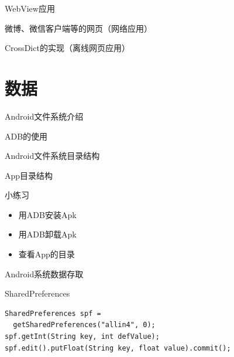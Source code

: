 \documentclass[presentation,dvipdfmx,CJKbookmarks]{beamer}
\begin{document}
\begin{CJK*}{UTF8}{simsun}
\begin{frame}[label={sec:org11b3bf5}]{WebView\thinspace 应用}
\begin{block}{微博、微信客户端等的网页（网络应用）}
\end{block}
\begin{block}{CrossDict\thinspace 的实现（离线网页应用）}
\end{block}
\end{frame}

\section{数据}
\label{sec:org08dc7b0}
\begin{frame}[label={sec:orgf2e294d}]{Android\thinspace 文件系统介绍}
\begin{block}{ADB\thinspace 的使用}
\end{block}
\begin{block}{Android\thinspace 文件系统目录结构}
\end{block}
\begin{block}{App\thinspace 目录结构}
\end{block}
\end{frame}

\begin{frame}[label={sec:org217fc53}]{小练习}
\begin{itemize}
\item 用\thinspace ADB\thinspace 安装\thinspace Apk
\item 用\thinspace ADB\thinspace 卸载\thinspace Apk
\item 查看\thinspace App\thinspace 的目录
\end{itemize}
\end{frame}

\begin{frame}[fragile,label={sec:org4e6177f}]{Android\thinspace 系统数据存取}
 \begin{block}{SharedPreferences}
\begin{verbatim}
SharedPreferences spf =
  getSharedPreferences("allin4", 0);
spf.getInt(String key, int defValue);
spf.edit().putFloat(String key, float value).commit();
\end{verbatim}
\end{block}


\end{frame}
\end{CJK*}
\end{document}
